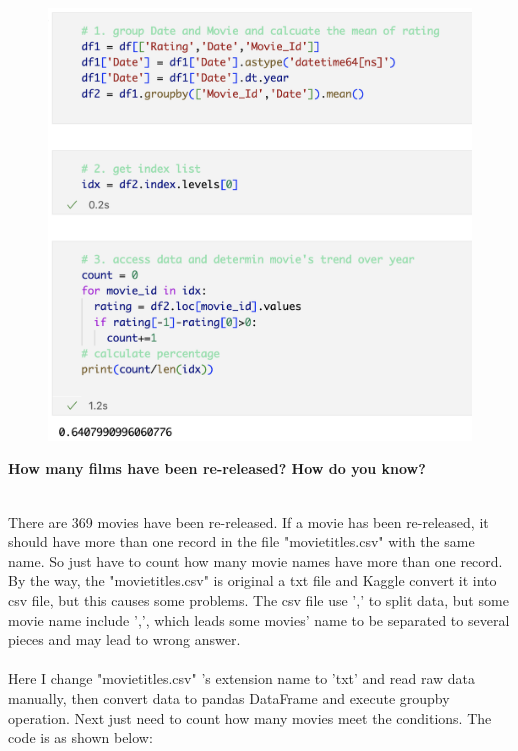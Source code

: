 \documentclass{article}
\begin{document}
\begin{enumerate}
{\begin{figure}[H]
\includegraphics[width = 13cm]{images/percentage.png}
\end{figure}
}
{
\linespread{2.0} \selectfont
\item \textbf {How many films have been re-released? How do you know?}
}
{
\linespread{1.5}\selectfont
\\There are 369 movies have been re-released. If a movie has been re-released, it should have more than one record in the file "movie\textunderscore titles.csv" with the same name. So just have to count how many movie names have more than one record. By the way, the "movie\textunderscore titles.csv" is original a txt file and Kaggle convert it into csv file, but this causes some problems. The csv file use ',' to split data, but some movie name include ',', which leads some movies' name to be separated to several pieces and may lead to wrong answer. 
\\
\\Here I change "movie\textunderscore titles.csv" 's extension name to 'txt' and read raw data manually, then convert data to pandas DataFrame and execute groupby operation. Next just need to count how many movies meet the conditions. The code is as shown below:
}
\begin{figure}[H]
\centering

\end{figure}
\end{enumerate}
\end{document}
